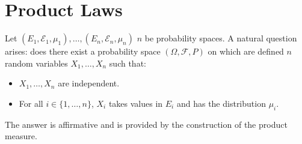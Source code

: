 \section{Product Laws}
Let $(E_1, \mathcal{E}_1, \mu_1), \ldots, (E_n, \mathcal{E}_n, \mu_n)$ $n$ be probability spaces.
A natural question arises: does there exist a probability space $(\Omega, \mathcal{F}, P)$ on which are defined $n$ random variables $X_1, \ldots, X_n$ such that:
\begin{itemize}
    \item $X_1, \ldots, X_n$ are independent.
    \item For all $i \in \{1, \ldots, n\}$, $X_i$ takes values in $E_i$ and has the distribution $\mu_i$.
\end{itemize}
The answer is affirmative and is provided by the construction of the product measure.
